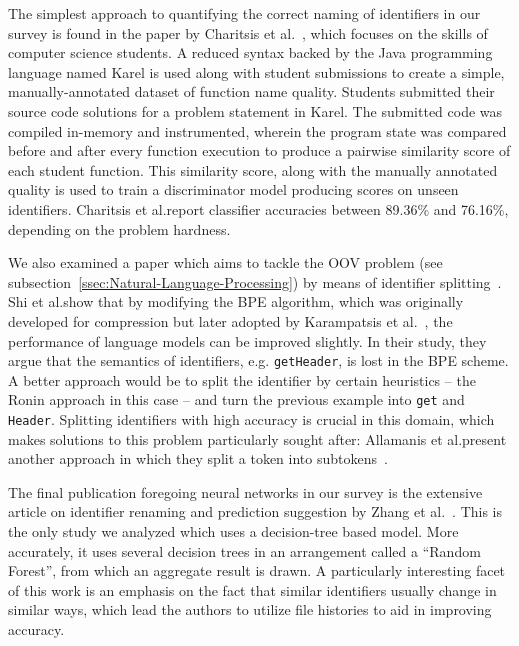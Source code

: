 \documentclass[conference]{IEEEtran}
\begin{document}
The simplest approach to quantifying the correct naming of identifiers in our survey is
found in the paper by Charitsis et al.\@~\cite{Charitsis2021Assessing}, which focuses on
the skills of computer science students. A reduced syntax backed by the Java programming
language named Karel is used along with student submissions to create a simple,
manually-annotated dataset of function name quality. Students submitted their source code
solutions for a problem statement in Karel. The submitted code was compiled in-memory and
instrumented, wherein the program state was compared before and after every function
execution to produce a pairwise similarity score of each student function. This similarity
score, along with the manually annotated quality is used to train a discriminator model
producing scores on unseen identifiers. Charitsis et al.\@ report classifier accuracies
between 89.36\% and 76.16\%, depending on the problem hardness.

We also examined a paper which aims to tackle the \ac{OOV} problem (see
subsection~\ref{ssec:Natural-Language-Processing}) by means of identifier
splitting~\cite{Shi2022Splitting}. Shi et al.\@ show that by modifying the \ac{BPE}
algorithm, which was originally developed for compression but later adopted by Karampatsis
et al.\@~\cite{Karampatsis2020BPE}, the performance of language models can be improved
slightly. In their study, they argue that the semantics of identifiers, e.g.\@
\verb-getHeader-, is lost in the \ac{BPE} scheme. A better approach would be to split the
identifier by certain heuristics -- the Ronin approach in this case -- and turn the
previous example into \verb-get- and \verb-Header-. Splitting identifiers with high
accuracy is crucial in this domain, which makes solutions to this problem particularly
sought after: Allamanis et al.\@ present another approach in which they split a token into
subtokens~\cite{Allamanis2015Suggesting}.

The final publication foregoing neural networks in our survey is the extensive article on
identifier renaming and prediction suggestion by Zhang et
al.~\cite{Zhang2023RenamingPrediction}. This is the only study we analyzed which uses a
decision-tree based model. More accurately, it uses several decision trees in an
arrangement called a \enquote{Random Forest}, from which an aggregate result is drawn. A
particularly interesting facet of this work is an emphasis on the fact that similar
identifiers usually change in similar ways, which lead the authors to utilize file
histories to aid in improving accuracy.
\end{document}
